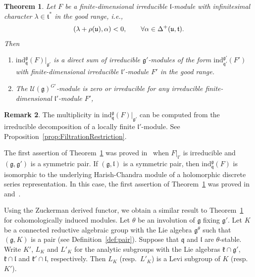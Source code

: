 \documentclass[pdftex]{sigma}
\numberwithin{equation}{section}
\newtheorem{Theorem}{Theorem}[section]
\theoremstyle{definition}
\newtheorem{Remark}[Theorem]{Remark}
\newcommand{\Hom}{\mathrm{Hom}}
\newcommand{\lieC}[1]{\mathfrak{#1}}
\newcommand{\lie}[1]{\mathfrak{#1}}
\newcommand{\univ}[1]{\mathcal{U}(\lieC{#1})}
\newcommand{\ind}[2]{\mathrm{ind}^{\lieC{#1}}_{\lieC{#2}}}
\let\Re\relax
\DeclareMathOperator{\Re}{\mathrm{Re}}
\newcommand{\rhog}[1]{\rho(#1)}
\begin{document}
\begin{Theorem}\label{intro:GeneralizedVerma}
	Let $F$ be a finite-dimensional irreducible $\lie{l}$-module with infinitesimal character $\lambda \in \lie{t}^*$ in the good range, i.e.,
	\begin{align*}
		\Re(\lambda + \rhog{\lie{u}}, \alpha) < 0, \qquad \forall \alpha \in \Delta^+(\lie{u}, \lie{t}).
	\end{align*}
	Then
	\begin{enumerate}\itemsep=0pt
		\item[$1.$] $\ind{g}{q}(F)|_{\lie{g'}}$ is a direct sum of irreducible $\lie{g'}$-modules of the form $\ind{g'}{q'}(F')$ with finite-dimensional irreducible $\lie{l'}$-module $F'$ in the good range.
		\item[$2.$] The $\univ{g}^{G'}$-module \smash{$\Hom_{\lie{g'}}\bigl(\ind{g'}{q'}(F'), \ind{g}{q}(F)|_{\lie{g'}}\bigr)$} is zero or irreducible for any irreducible finite-dimensional $\lie{l'}$-module $F'$,
	\end{enumerate}
\end{Theorem}

\begin{Remark}
	The multiplicity in $\ind{g}{q}(F)|_{\lie{g'}}$ can be computed from the irreducible decomposition of a locally finite $\lie{l'}$-module.
	See Proposition~\ref{prop:FiltrationRestriction}.
\end{Remark}

The first assertion of Theorem~\ref{intro:GeneralizedVerma} was proved in~\cite[Lemma~3.1]{HMSW87} when $F|_{\lie{l'}}$ is irreducible and $(\lie{g}, \lie{g'})$ is a symmetric pair.
If $(\lie{g}, \lie{l})$ is a symmetric pair, then $\ind{g}{q}(F)$ is isomorphic to the underlying Harish-Chandra module of a holomorphic discrete series representation.
In this case, the first assertion of Theorem~\ref{intro:GeneralizedVerma} was proved in~\cite[Theorem~7.4]{Ko98} and~\cite{Ko12_generalized_Verma}.

Using the Zuckerman derived functor, we obtain a similar result to Theorem~\ref{intro:GeneralizedVerma} for cohomologically induced modules.
Let $\theta$ be an involution of $\lie{g}$ fixing $\lie{g'}$.
Let $K$ be a connected reductive algebraic group with the Lie algebra $\lie{g}^\theta$ such that $(\lie{g}, K)$ is a pair (see Definition~\ref{def:pair}).
Suppose that $\lie{q}$ and $\lie{l}$ are $\theta$-stable.
Write $K'$, $L_K$ and $L'_K$ for the analytic subgroups with the Lie algebras $\lie{k}\cap \lie{g'}$, $\lie{k}\cap \lie{l}$ and $\lie{k'}\cap \lie{l}$, respectively.
Then $L_K$ (resp.\ $L'_K$) is a Levi subgroup of $K$ (resp.\ $K'$).
\end{document}

